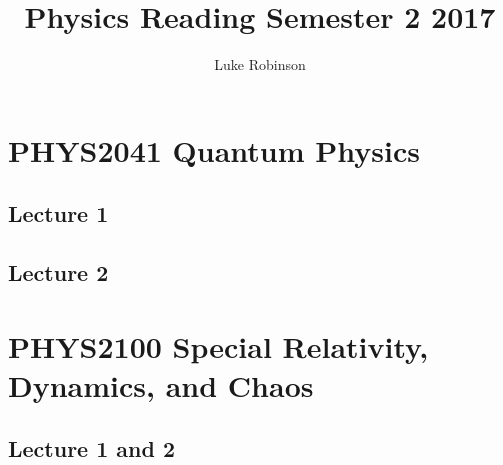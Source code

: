 \documentclass[8pt,a4paper,oneside]{article}
\title{Physics Reading Semester 2 2017}
\author{Luke Robinson}
\begin{document}
\maketitle
\tableofcontents
\newpage
\section{PHYS2041 Quantum Physics}
\subsection{Lecture 1}

\subsection{Lecture 2}

\section{PHYS2100 Special Relativity, Dynamics, and Chaos}
\subsection{Lecture 1 and 2}

\end{document}
